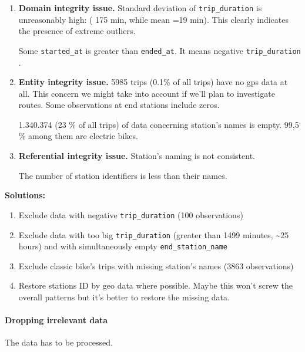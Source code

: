 \documentclass[
]{article}
\begin{document}
\begin{enumerate}
\def\labelenumi{\arabic{enumi}.}
\item
  \textbf{Domain integrity issue.} Standard deviation of
  \texttt{trip\_duration} is unreasonably high: ( 175 min, while mean
  =19 min). This clearly indicates the presence of extreme outliers.

  Some \texttt{started\_at} is greater than \texttt{ended\_at}. It means
  negative \texttt{trip\_duration} .
\item
  \textbf{Entity integrity issue.} 5985 trips (0.1\% of all trips) have
  no gps data at all. This concern we might take into account if we'll
  plan to investigate routes. Some observations at end stations include
  zeros.

  1.340.374 (23 \% of all trips) of data concerning station's names is
  empty. 99,5 \% among them are electric bikes.
\item
  \textbf{Referential integrity issue.} Station's naming is not
  consistent.

  The number of station identifiers is less than their names.\\
\end{enumerate}

\textbf{Solutions:}

\begin{enumerate}
\def\labelenumi{\arabic{enumi}.}
\item
  Exclude data with negative \texttt{trip\_duration} (100 observations)
\item
  Exclude data with too big \texttt{trip\_duration} (greater than 1499
  minutes, \textasciitilde25 hours) and with simultaneously empty
  \texttt{end\_station\_name}
\item
  Exclude classic bike's trips with missing station's names (3863
  observations)
\item
  Restore stations ID by geo data where possible. Maybe this won't screw
  the overall patterns but it's better to restore the missing data.
\end{enumerate}

\hypertarget{dropping-irrelevant-data}{%
\paragraph{Dropping irrelevant data}\label{dropping-irrelevant-data}}

The data has to be processed.\\
\end{document}
